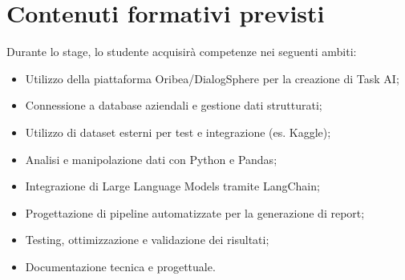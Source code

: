 \section*{Contenuti formativi previsti}
Durante lo stage, lo studente acquisirà competenze nei seguenti ambiti:
\begin{itemize}
 \item Utilizzo della piattaforma Oribea/DialogSphere per la creazione di Task AI;\\
 \item Connessione a database aziendali e gestione dati strutturati;
 \item Utilizzo di dataset esterni per test e integrazione (es. Kaggle);
 \item Analisi e manipolazione dati con Python e Pandas;
 \item Integrazione di Large Language Models tramite LangChain;
 \item Progettazione di pipeline automatizzate per la generazione di report;
 \item Testing, ottimizzazione e validazione dei risultati;
 \item Documentazione tecnica e progettuale.
\end{itemize}

\newpage
